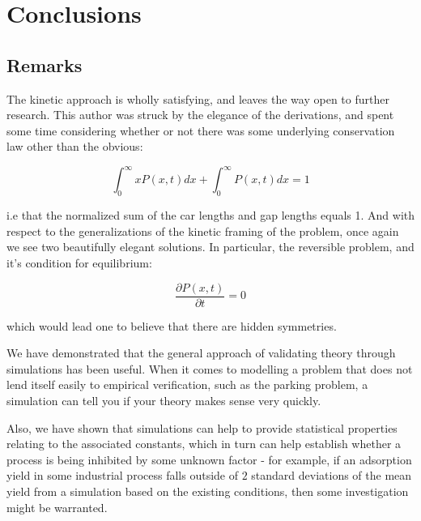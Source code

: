 
\chapter{Conclusions}











\section{Remarks}

The kinetic approach is wholly satisfying, and leaves the way open to further research. 
This author was struck by the elegance of the derivations, and spent some time considering 
whether or not there was some underlying conservation law other than the obvious: \bigskip

\[
	\int_{0}^{\infty} x P(x, t) dx + \int_{0}^{\infty} P(x, t) dx = 1
\]\medskip

i.e that the normalized sum of the car lengths and gap lengths equals 1. And with respect to 
the generalizations of the kinetic framing of the problem, once again we see two beautifully 
elegant solutions. In particular, the reversible problem, and it's condition for equilibrium: \bigskip

\[
	\frac{\partial P(x, t)}{\partial t} = 0
\]\medskip

which would lead one to believe that there are hidden symmetries. \bigskip

We have demonstrated that the general approach of validating theory through simulations has 
been useful. When it comes to modelling a problem that does not lend itself easily to 
empirical verification, such as the parking problem, a simulation can tell you if your theory 
makes sense very quickly. \bigskip

Also, we have shown that simulations can help to provide statistical properties relating to 
the associated constants, which in turn can help establish whether a process is being 
inhibited by some unknown factor - for example, if an adsorption yield in some industrial 
process falls outside of $2$ standard deviations of the mean yield from a simulation based 
on the existing conditions, then some investigation might be warranted. \bigskip











